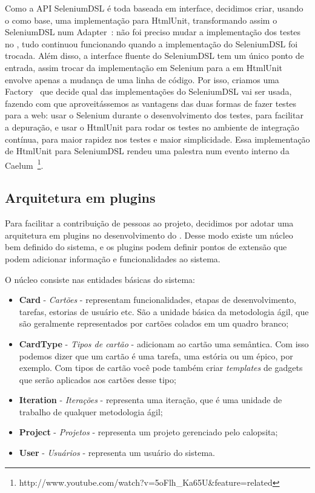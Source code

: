 Como a API SeleniumDSL é toda baseada em interface, decidimos criar, usando o \calopsita como base, uma implementação para HtmlUnit, transformando assim o SeleniumDSL num Adapter~\cite{gof}: não foi preciso mudar a implementação dos testes no \calopsita, tudo continuou funcionando quando a implementação do SeleniumDSL foi trocada. Além disso, a interface fluente do SeleniumDSL tem um único ponto de entrada, assim trocar da implementação em Selenium para a em HtmlUnit envolve apenas a mudança de uma linha de código. Por isso, criamos uma Factory~\cite{gof} que decide qual das implementações do SeleniumDSL vai ser usada, fazendo com que aproveitássemos as vantagens das duas formas de fazer testes para a web: usar o Selenium durante o desenvolvimento dos testes, para facilitar a depuração, e usar o HtmlUnit para rodar os testes no ambiente de integração contínua, para maior rapidez nos testes e maior simplicidade. Essa implementação de HtmlUnit para SeleniumDSL rendeu uma palestra num evento interno da Caelum~\footnote{http://www.youtube.com/watch?v=5oFlh\_Ka65U\&feature=related}.

\subsection{Arquitetura em plugins}

Para facilitar a contribuição de pessoas ao projeto, decidimos por adotar uma arquitetura em plugins no desenvolvimento do \calopsita. Desse modo existe um núcleo bem definido do sistema, e os plugins podem definir pontos de extensão que podem adicionar informação e funcionalidades ao sistema.

O núcleo consiste nas entidades básicas do sistema:

\begin{itemize}
	\item{\textbf{Card} - \textit{Cartões} - representam funcionalidades, etapas de desenvolvimento, tarefas, estorias de usuário etc. São a unidade básica da metodologia ágil, que são geralmente representados por cartões colados em um quadro branco;}
	\item{\textbf{CardType} - \textit{Tipos de cartão} - adicionam ao cartão uma semântica. Com isso podemos dizer que um cartão é uma tarefa, uma estória ou um épico, por exemplo. Com tipos de cartão você pode também criar \textit{templates} de gadgets que serão aplicados aos cartões desse tipo;}
	\item{\textbf{Iteration} - \textit{Iterações} - representa uma iteração, que é uma unidade de trabalho de qualquer metodologia ágil;}
	\item{\textbf{Project} - \textit{Projetos} - representa um projeto gerenciado pelo calopsita;}
	\item{\textbf{User} - \textit{Usuários} - representa um usuário do sistema.}
\end{itemize}

